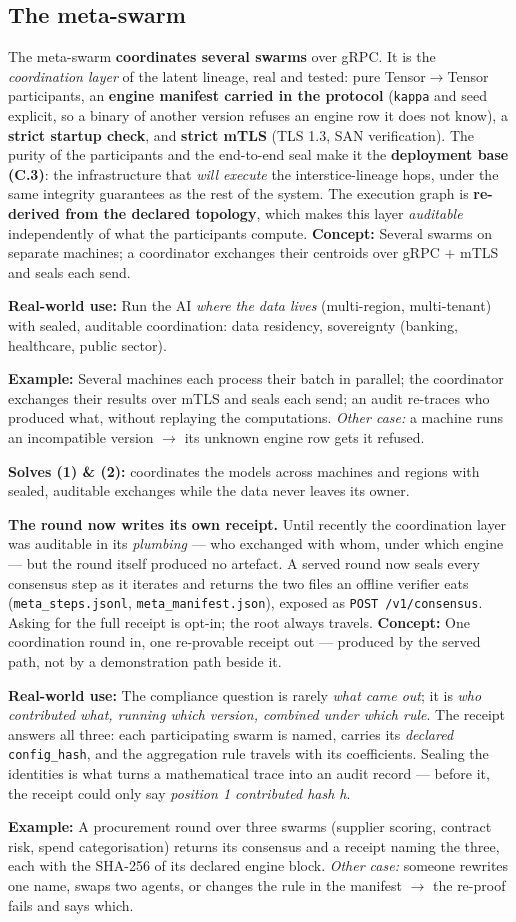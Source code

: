 \documentclass[11pt]{article}
\newcommand{\concept}[1]{{\color{efenavy}\textbf{Concept:} }#1\par}
\newcommand{\exemple}[1]{{\color{efeamber}\textbf{Example:} }#1\par}
\newcommand{\utilite}[1]{{\color{efeplum}\textbf{Real-world use:} }#1\par}
\newcommand{\solves}[2]{{\color{efesolve}\textbf{Solves #1:} }#2\par}
\begin{document}
\subsection{The meta-swarm}
The meta-swarm \textbf{coordinates several swarms} over gRPC. It is the \emph{coordination layer} of
the latent lineage, real and tested: pure Tensor$\rightarrow$Tensor participants, an \textbf{engine
manifest carried in the protocol} (\texttt{kappa} and seed explicit, so a binary of another version
refuses an engine row it does not know), a \textbf{strict startup check}, and \textbf{strict mTLS}
(TLS 1.3, SAN verification). The purity of the participants and the end-to-end seal make it the
\textbf{deployment base (C.3)}: the infrastructure that \emph{will execute} the interstice-lineage
hops, under the same integrity guarantees as the rest of the system. The execution graph is
\textbf{re-derived from the declared topology}, which makes this layer \emph{auditable} independently
of what the participants compute.
\concept{Several swarms on separate machines; a coordinator exchanges their centroids over gRPC +
mTLS and seals each send.}
\utilite{Run the AI \emph{where the data lives} (multi-region, multi-tenant) with sealed, auditable
coordination: data residency, sovereignty (banking, healthcare, public sector).}
\exemple{Several machines each process their batch in parallel; the coordinator exchanges their
results over mTLS and seals each send; an audit re-traces who produced what, without replaying the
computations. \emph{Other case:} a machine runs an incompatible version $\rightarrow$ its unknown
engine row gets it refused.}
\solves{(1) \& (2)}{coordinates the models across machines and regions with sealed, auditable exchanges while the data never leaves its owner.}

{\color{efenavy}\textbf{The round now writes its own receipt.}} Until recently the coordination layer
was auditable in its \emph{plumbing} --- who exchanged with whom, under which engine --- but the
round itself produced no artefact. A served round now seals every consensus step as it iterates and
returns the two files an offline verifier eats (\texttt{meta\_steps.jsonl},
\texttt{meta\_manifest.json}), exposed as \texttt{POST /v1/consensus}. Asking for the full receipt is
opt-in; the root always travels.
\concept{One coordination round in, one re-provable receipt out --- produced by the served path, not
by a demonstration path beside it.}
\utilite{The compliance question is rarely \emph{what came out}; it is \emph{who contributed what,
running which version, combined under which rule}. The receipt answers all three: each participating
swarm is named, carries its \emph{declared} \texttt{config\_hash}, and the aggregation rule travels
with its coefficients. Sealing the identities is what turns a mathematical trace into an audit
record --- before it, the receipt could only say \emph{position 1 contributed hash h}.}
\exemple{A procurement round over three swarms (supplier scoring, contract risk, spend
categorisation) returns its consensus and a receipt naming the three, each with the SHA-256 of its
declared engine block. \emph{Other case:} someone rewrites one name, swaps two agents, or changes
the rule in the manifest $\rightarrow$ the re-proof fails and says which.}
\end{document}
